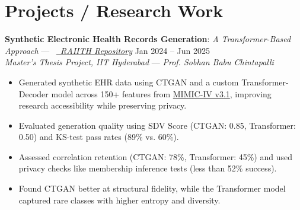 \documentclass[a4paper,10pt]{article}
\begin{document}
\section*{Projects / Research Work}
\vspace{-8pt}
\textbf{Synthetic Electronic Health Records Generation}: \textit{A Transformer-Based Approach} --- ~\textit{\href{https://raiith.krc.iith.ac.in/handle/123456789/63279}{\faLink~RAIITH Repository}} \hfill Jan 2024 -- Jun 2025\\
\textit{Master's Thesis Project, IIT Hyderabad} --- \textit{Prof. Sobhan Babu Chintapalli} \\
\vspace{-12pt}
\begin{itemize}[leftmargin=*, itemsep=1.5mm, rightmargin=2ex]
    \item Generated synthetic EHR data using CTGAN and a custom Transformer-Decoder model across 150+ features from \href{https://physionet.org/content/mimiciv/3.1/}{MIMIC-IV v3.1}, improving research accessibility while preserving privacy. \vspace{-8pt}
    \item Evaluated generation quality using SDV Score (CTGAN: 0.85, Transformer: 0.50) and KS-test pass rates (89\% vs. 60\%). \vspace{-8pt}
    \item Assessed correlation retention (CTGAN: 78\%, Transformer: 45\%) and used privacy checks like membership inference tests (less than 52\% success). \vspace{-8pt}
    \item Found CTGAN better at structural fidelity, while the Transformer model captured rare classes with higher entropy and diversity.
\end{itemize}
\vspace{3pt}
\end{document}
